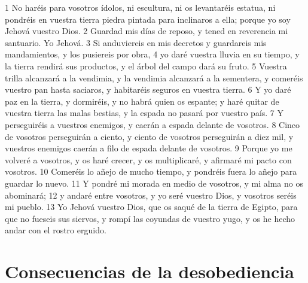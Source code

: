 1 No haréis para vosotros ídolos, ni escultura,  ni os levantaréis estatua, ni pondréis en vuestra tierra piedra pintada para inclinaros a ella; porque yo soy Jehová vuestro Dios.
2 Guardad mis días de reposo, y tened en reverencia mi santuario. Yo Jehová.
3 Si anduviereis en mis decretos y guardareis mis mandamientos, y los pusiereis por obra,
4 yo daré vuestra lluvia en su tiempo, y la tierra rendirá sus productos, y el árbol del campo dará su fruto.
5 Vuestra trilla alcanzará a la vendimia, y la vendimia alcanzará a la sementera, y comeréis vuestro pan hasta saciaros, y habitaréis seguros en vuestra tierra.
6 Y yo daré paz en la tierra, y dormiréis, y no habrá quien os espante; y haré quitar de vuestra tierra las malas bestias, y la espada no pasará por vuestro país.
7 Y perseguiréis a vuestros enemigos, y caerán a espada delante de vosotros.
8 Cinco de vosotros perseguirán a ciento, y ciento de vosotros perseguirán a diez mil, y vuestros enemigos caerán a filo de espada delante de vosotros.
9 Porque yo me volveré a vosotros, y os haré crecer, y os multiplicaré, y afirmaré mi pacto con vosotros.
10 Comeréis lo añejo de mucho tiempo, y pondréis fuera lo añejo para guardar lo nuevo.
11 Y pondré mi morada en medio de vosotros, y mi alma no os abominará;
12 y andaré entre vosotros, y yo seré vuestro Dios, y vosotros seréis mi pueblo.
13 Yo Jehová vuestro Dios, que os saqué de la tierra de Egipto, para que no fueseis sus siervos, y rompí las coyundas de vuestro yugo, y os he hecho andar con el rostro erguido.  

\section{Consecuencias de la desobediencia}


